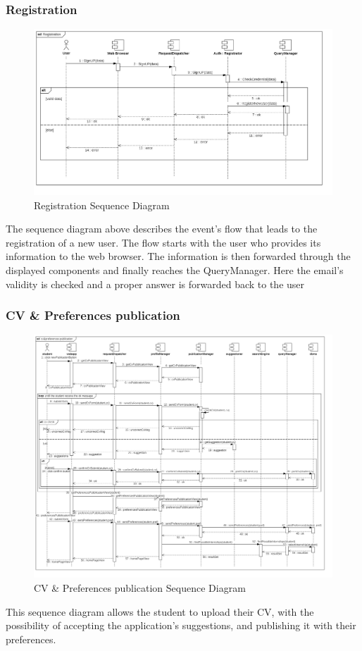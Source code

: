 \documentclass{article}
\begin{document}
\subsubsection{Registration}
\begin{figure}[H]
    \centering
    \includegraphics[width=1\linewidth]{SequenceDiagram/Registration.jpg}
    \caption{Registration Sequence Diagram}
    \label{fig:enter-label}
\end{figure}
The sequence diagram above describes  the event's flow that leads to the registration of a new user. The flow starts with the user who provides its information to the web browser. The information is then forwarded through the displayed components and finally reaches the QueryManager. Here the email's validity is checked and a proper answer is forwarded back to the user 

\subsubsection{CV \& Preferences publication}

\begin{figure}[H]
    \centering
    \includegraphics[width=1\linewidth]{SequenceDiagram/cv&preferences publication.jpg}
    \caption{CV \& Preferences publication Sequence Diagram}
    \label{fig:enter-label}
\end{figure}
This sequence diagram allows the student to upload their CV, with the possibility of accepting the application's suggestions, and publishing it with their preferences. 
\end{document}
